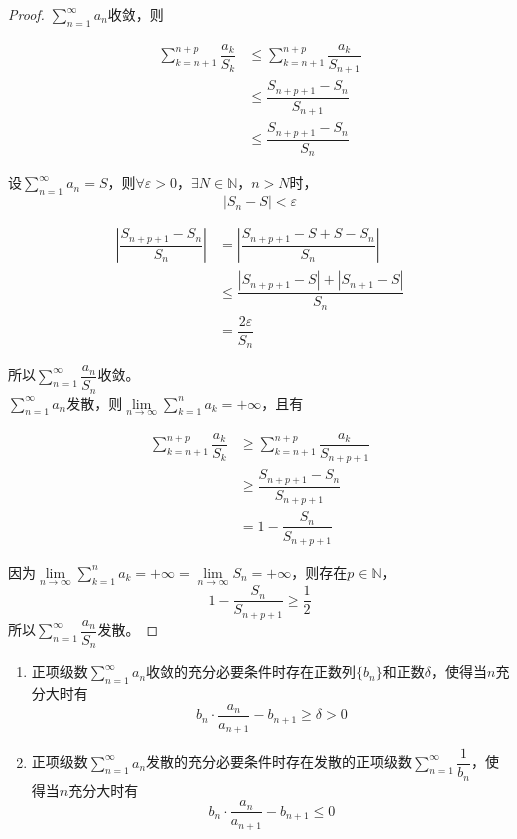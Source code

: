 \begin{proof}
    
    $\sum\limits_{n=1}^{\infty}{a_n}$收敛，则

    \begin{align*}
        \sum\limits_{k=n+1}^{n+p}{\dfrac{a_k}{S_k}} & \leq \sum\limits_{k=n+1}^{n+p}{\dfrac{a_k}{S_{n+1}}}\\
        &\leq \dfrac{S_{n+p+1}-S_{n}}{S_{n+1}}\\
        &\leq \dfrac{S_{n+p+1}-S_{n}}{S_{n}}
    \end{align*}

    设$\sum\limits_{n=1}^{\infty}{a_n} = S$，则$\forall \varepsilon >0$，$\exists N\in\mathbb{N}$，$n>N$时，
    $$|S_n-S|<\varepsilon$$

    \begin{align*}
        \left|\dfrac{S_{n+p+1}-S_{n}}{S_{n}}\right| &= \left|\dfrac{S_{n+p+1}-S+S-S_{n}}{S_{n}}\right|\\
        & \leq \dfrac{|S_{n+p+1}-S|+|S_{n+1}-S|}{S_n}\\
        & = \dfrac{2\varepsilon}{S_n}
    \end{align*}

    所以$\sum\limits_{n=1}^{\infty}{\dfrac{a_n}{S_n}}$收敛。\\
    $\sum\limits_{n=1}^{\infty}{a_n}$发散，则$\lim\limits_{n\to\infty}{\sum\limits_{k=1}^{n}{a_k}}=+\infty$，且有

    \begin{align*}
        \sum\limits_{k=n+1}^{n+p}{\dfrac{a_k}{S_k}} & \geq \sum\limits_{k=n+1}^{n+p}{\dfrac{a_k}{S_{n+p+1}}}\\
        &\geq \dfrac{S_{n+p+1}-S_{n}}{S_{n+p+1}}\\
        &= 1-\dfrac{S_{n}}{S_{n+p+1}}
    \end{align*}

    因为$\lim\limits_{n\to\infty}{\sum\limits_{k=1}^{n}{a_k}}=+\infty=\lim\limits_{n\to\infty}{S_n}=+\infty$，则存在$p\in\mathbb{N}$，
    $$1-\dfrac{S_{n}}{S_{n+p+1}} \geq \dfrac{1}{2}$$
    所以$\sum\limits_{n=1}^{\infty}{\dfrac{a_n}{S_n}}$发散。

\end{proof}

\begin{theorem}
    
    \begin{enumerate}

        \item 
            正项级数$\sum\limits_{n=1}^{\infty}{a_n}$收敛的充分必要条件时存在正数列$\{b_n\}$和正数$\delta$，使得当$n$充分大时有
            $$b_n \cdot \dfrac{a_n}{a_{n+1}}-b_{n+1}\geq \delta >0$$

        \item 
            正项级数$\sum\limits_{n=1}^{\infty}{a_n}$发散的充分必要条件时存在发散的正项级数$\sum\limits_{n=1}^{\infty}{\dfrac{1}{b_n}}$，使得当$n$充分大时有
            $$b_n  \cdot \dfrac{a_n}{a_{n+1}}-b_{n+1}\leq0$$

    \end{enumerate}

\end{theorem}


